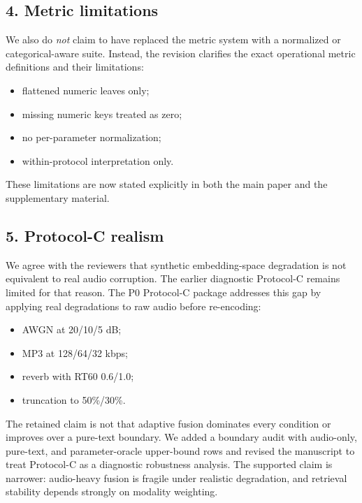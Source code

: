 \documentclass[11pt,a4paper]{article}
\begin{document}
\subsection*{4. Metric limitations}

We also do \emph{not} claim to have replaced the metric system with a normalized or categorical-aware suite. Instead, the revision clarifies the exact operational metric definitions and their limitations:

\begin{itemize}[leftmargin=2em]
    \item flattened numeric leaves only;
    \item missing numeric keys treated as zero;
    \item no per-parameter normalization;
    \item within-protocol interpretation only.
\end{itemize}

These limitations are now stated explicitly in both the main paper and the supplementary material.

\subsection*{5. Protocol-C realism}

We agree with the reviewers that synthetic embedding-space degradation is not equivalent to real audio corruption. The earlier diagnostic Protocol-C remains limited for that reason. The P0 Protocol-C package addresses this gap by applying real degradations to raw audio before re-encoding:

\begin{itemize}[leftmargin=2em]
    \item AWGN at 20/10/5 dB;
    \item MP3 at 128/64/32 kbps;
    \item reverb with RT60 0.6/1.0;
    \item truncation to 50\%/30\%.
\end{itemize}

The retained claim is not that adaptive fusion dominates every condition or improves over a pure-text boundary. We added a boundary audit with audio-only, pure-text, and parameter-oracle upper-bound rows and revised the manuscript to treat Protocol-C as a diagnostic robustness analysis. The supported claim is narrower: audio-heavy fusion is fragile under realistic degradation, and retrieval stability depends strongly on modality weighting.
\end{document}
